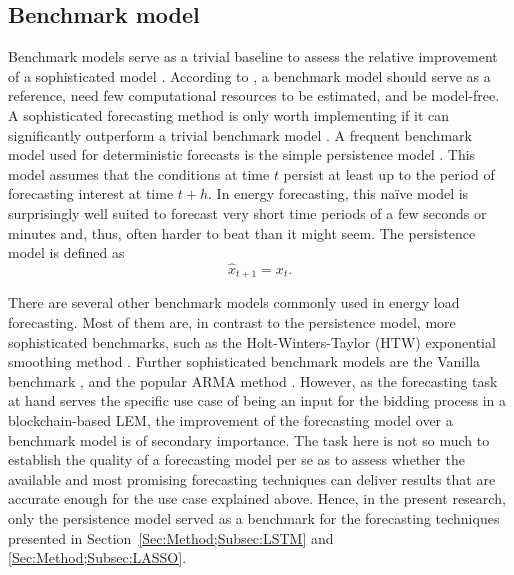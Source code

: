 
\subsection{Benchmark model} \label{Sec:Method;Subsec:Benchmark}

Benchmark models serve as a trivial baseline to assess the relative improvement of a sophisticated model \citep{Meer:2018}. According to \citet{Pinson:2012}, a benchmark model should serve as a reference, need few computational resources to be estimated, and be model-free. A sophisticated forecasting method is only worth implementing if it can significantly outperform a trivial benchmark model \citep{Diagne:2013}. A frequent benchmark model used for deterministic forecasts is the simple persistence model \citep{Meer:2018}. This model assumes that the conditions at time $t$ persist at least up to the period of forecasting interest at time $t+h$. In energy forecasting, this na\"ive model is surprisingly well suited to forecast very short time periods of a few seconds or minutes \citep{Pinson:2012} and, thus, often harder to beat than it might seem. The persistence model is defined as
%
\begin{equation} \label{Eq:naivepred}
\widehat{x}_{t+1}=x_t.
\end{equation}

There are several other benchmark models commonly used in energy load forecasting. Most of them are, in contrast to the persistence model, more sophisticated benchmarks, such as the Holt-Winters-Taylor (HTW) exponential smoothing method \citep[see, e.g.,][]{Arora:2016}. Further sophisticated benchmark models are the Vanilla benchmark \citep{hong:2010}, and the popular ARMA method \citep{Box:1990}. However, as the forecasting task at hand serves the specific use case of being an input for the bidding process in a blockchain-based LEM, the improvement of the forecasting model over a benchmark model is of secondary importance. The task here is not so much to establish the quality of a forecasting model per se as to assess whether the available and most promising forecasting techniques can deliver results that are accurate enough for the use case explained above. Hence, in the present research, only the persistence model served as a benchmark for the forecasting techniques presented in Section~\ref{Sec:Method;Subsec:LSTM} and \ref{Sec:Method;Subsec:LASSO}.



